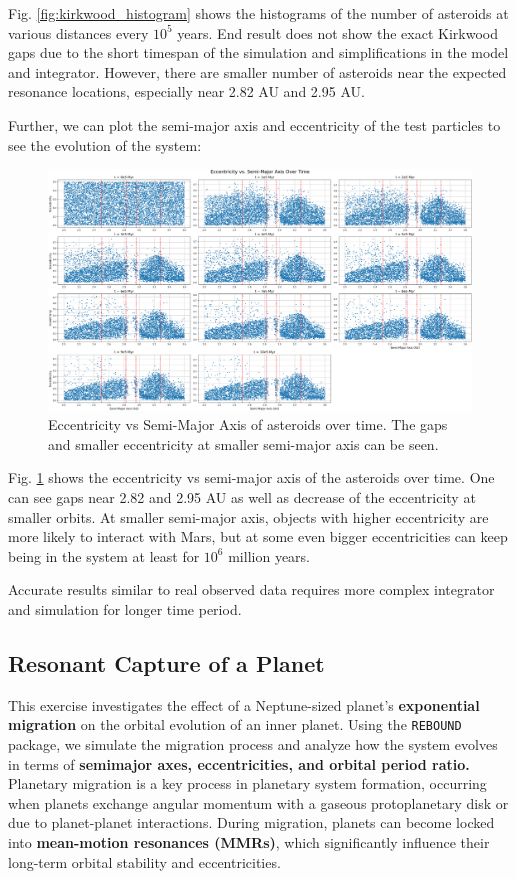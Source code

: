 \documentclass[12pt,a4paper]{article}
\begin{document}
Fig. \ref{fig:kirkwood_histogram} shows the histograms of the number of asteroids at various distances every $10^5$ years.
End result does not show the exact Kirkwood gaps due to the short timespan of the simulation and simplifications in the model and integrator. However, there are smaller number of asteroids near the expected resonance locations, especially near 2.82 AU and 2.95 AU.

Further, we can plot the semi-major axis and eccentricity of the test particles to see the evolution of the system:

\begin{figure}[ht]
  \centering
  \includegraphics[width=\linewidth]{kirkwood/a_e_kirkwood.png}
  \caption{Eccentricity vs Semi-Major Axis of asteroids over time. The gaps and smaller eccentricity at smaller semi-major axis can be seen.}
  \label{fig:kirkwood_a_e}
\end{figure}

Fig. \ref{fig:kirkwood_a_e} shows the eccentricity vs semi-major axis of the asteroids over time. One can see gaps near 2.82 and 2.95 AU as well as decrease of the eccentricity at smaller orbits.
At smaller semi-major axis, objects with higher eccentricity are more likely to interact with Mars, but at some even bigger eccentricities can keep being in the system at least for $10^6$ million years.

Accurate results similar to real observed data requires more complex integrator and simulation for longer time period.

\subsection{Resonant Capture of a Planet}
This exercise investigates the effect of a Neptune-sized planet's \textbf{exponential migration} on the orbital evolution of an inner planet. Using the \texttt{REBOUND} package, we simulate the migration process and analyze how the system evolves in terms of \textbf{semimajor axes, eccentricities, and orbital period ratio.}
\\ Planetary migration is a key process in planetary system formation, occurring when planets exchange angular momentum with a gaseous protoplanetary disk or due to planet-planet interactions. During migration, planets can become locked into \textbf{mean-motion resonances (MMRs)}, which significantly influence their long-term orbital stability and eccentricities.
\end{document}
